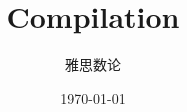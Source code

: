\documentclass{mathrep}
\title{Compilation}
\date{\today}
\author{雅思数论}
\begin{document}
\frontmatter
\maketitle


\tableofcontents

\mainmatter





\begin{appendices}
\listoffigures
\listoftables
\end{appendices}
\backmatter
\layout
\end{document}
